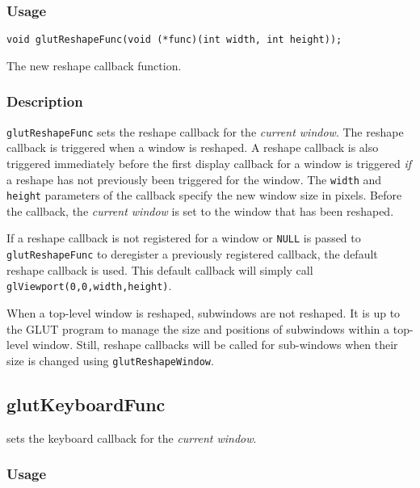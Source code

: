 \subsubsection*{Usage}
\begin{verbatim}
void glutReshapeFunc(void (*func)(int width, int height));
\end{verbatim}
\begin{description}
\itemsep 0in
\item[\tt func]
The new reshape callback function.
\end{description}

\subsubsection*{Description}

{\tt glutReshapeFunc} sets the reshape callback for the {\em current window}.
The reshape callback is triggered when a window is reshaped.
A reshape callback is also triggered immediately before the first display callback
for a window is triggered {\em if} a reshape has not previously been triggered for the window.
The {\tt width} and {\tt height} parameters of the callback
specify the new window size in pixels.  Before the callback, the {\em current
window} is set to the window that has been reshaped.

If a reshape callback is not registered for a window or {\tt NULL} is
passed to {\tt glutReshapeFunc} to deregister a previously registered
callback, the default reshape callback is used.  This default callback
will simply call {\tt glViewport(0,0,width,height)}.

When a top-level window is reshaped, subwindows are not reshaped.  It is
up to the GLUT program to manage the size and positions of subwindows
within a top-level window.  Still, reshape callbacks will be called for
sub-windows when their size is changed using {\tt glutReshapeWindow}.

\subsection{glutKeyboardFunc}

 sets the keyboard callback for the {\em current window}.

\subsubsection*{Usage}

